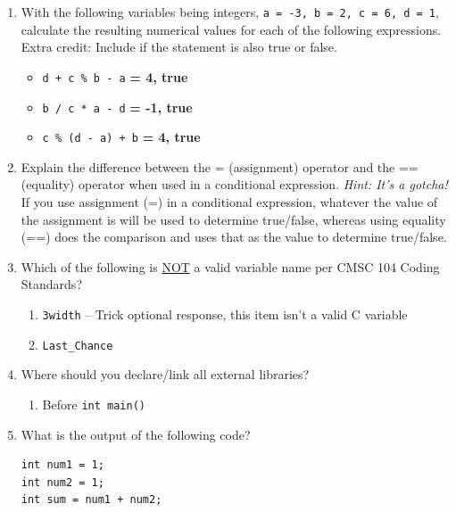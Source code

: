 \documentclass[letter,11pt]{article}
\newcommand*\tick{\item[\Checkmark]}
\newcommand*\fail{\item[\XSolidBrush]}
\begin{document}
\begin{enumerate}
    \item With the following variables being integers, \texttt{a = -3, b = 2, c = 6, d = 1}, calculate the resulting numerical values for each of the following expressions. Extra credit: Include if the statement is also true or false.
    \begin{itemize}
        \item \texttt{d + c \% b - a} \textbf{= 4, true}
        \item \texttt{b / c * a - d} \textbf{= -1, true}
        \item \texttt{c \% (d - a) + b} \textbf{= 4, true}
    \end{itemize}
    
    \item Explain the difference between the = (assignment) operator and the == (equality) operator when used in a conditional expression. \textit{Hint: It's a gotcha!} \\
    If you use assignment (=) in a conditional expression, whatever the value of the assignment is will be used to determine true/false, whereas using equality (==) does the comparison and uses that as the value to determine true/false.
    
    \item Which of the following is \underline{NOT} a valid variable name per CMSC 104 Coding Standards?
    \begin{enumerate}
        \fail \texttt{3width} -- Trick optional response, this item isn't a valid C variable
        \tick \texttt{Last\_Chance}
    \end{enumerate}
    
    \item Where should you declare/link all external libraries?
    \begin{enumerate}
        \tick Before \texttt{int main()}
    \end{enumerate}
    
    \item What is the output of the following code?
    \begin{verbatim}
int num1 = 1;
int num2 = 1;
int sum = num1 + num2;


\end{verbatim}
\end{enumerate}
\end{document}
